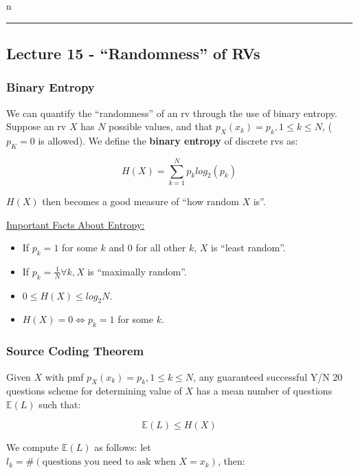 n\documentclass{article}
\begin{document}
\medskip\hrule
\subsection{Lecture 15 - ``Randomness'' of RVs}

\subsubsection{Binary Entropy}

We can quantify the ``randomness'' of an rv through the use of binary
entropy. Suppose an rv $X$ has $N$ possible values, and that $p_X(x_k)
= p_k, 1\leq k\leq N$, ($p_K=0$ is allowed). We define the
\textbf{binary entropy} of discrete rvs as:

\begin{equation}
  \tag{Binary Entroy of RVs}
  \boxed{
    H(X) = \sum_{k=1}^{N} p_klog_2(p_k)
  }
\end{equation}

$H(X)$ then becomes a good measure of ``how random $X$ is''.

\bigskip
\underline{Important Facts About Entropy:}

\begin{itemize}
\item If $p_k = 1$ for some $k$ and $0$ for all other $k$, $X$ is
  ``least random''.

\item If $p_k = \frac{1}{N} \forall k, X$ is ``maximally random''.
  
\item $0 \leq H(X) \leq log_2N$.
  
\item $H(X) = 0 \Leftrightarrow p_k = 1$ for some $k$.
\end{itemize}

\subsubsection{Source Coding Theorem}

Given $X$ with pmf $p_X(x_k) = p_k, 1 \leq k \leq N$, any guaranteed
successful Y/N 20 questions scheme for determining value of $X$ has a
mean number of questions $\mathbb{E}(L)$ such that:

\begin{equation}
  \tag{Source Coding Theorm}
  \boxed{
    \mathbb{E}(L) \leq H(X)
  }
\end{equation}

We compute $\mathbb{E}(L)$ as follows: let $l_k = \#(\text{questions
  you need to ask when } X = x_k)$, then:
\end{document}
